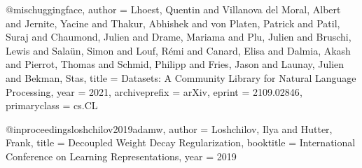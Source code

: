 \documentclass{article}
\begin{document}
@misc{huggingface,
  author        = {Lhoest, Quentin and {Villanova del Moral}, Albert and
                   Jernite, Yacine and Thakur, Abhishek and {von Platen}, Patrick and
                   Patil, Suraj and Chaumond, Julien and Drame, Mariama and
                   Plu, Julien and Bruschi, Lewis and Sala{\"{u}}n, Simon and
                   Louf, R{\'{e}}mi and Canard, Elisa and Dalmia, Akash and
                   Pierrot, Thomas and Schmid, Philipp and Fries, Jason and
                   Launay, Julien and Bekman, Stas},
  title         = {Datasets: A Community Library for Natural Language Processing},
  year          = {2021},
  archiveprefix = {arXiv},
  eprint        = {2109.02846},
  primaryclass  = {cs.CL}
}

@inproceedings{loshchilov2019adamw,
  author    = {Loshchilov, Ilya and Hutter, Frank},
  title     = {Decoupled Weight Decay Regularization},
  booktitle = {International Conference on Learning Representations},
  year      = {2019}
}
\end{document}
